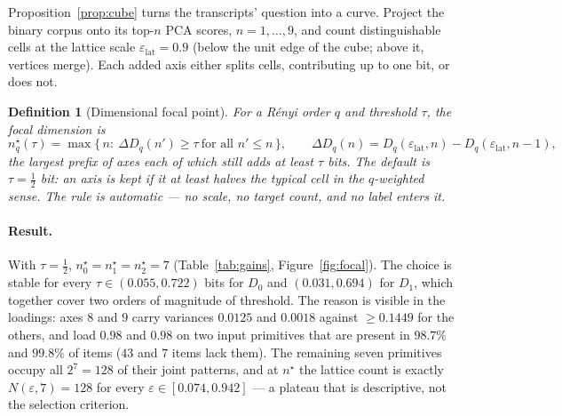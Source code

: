 \documentclass[11pt,a4paper]{article}
\theoremstyle{plain}
\newtheorem{definition}{Definition}
\theoremstyle{remark}
\begin{document}
Proposition~\ref{prop:cube} turns the transcripts' question into a curve. Project the binary corpus onto its top-$n$ PCA scores, $n=1,\dots,9$, and count distinguishable cells at the lattice scale $\varepsilon_{\mathrm{lat}}=0.9$ (below the unit edge of the cube; above it, vertices merge). Each added axis either splits cells, contributing up to one bit, or does not.

\begin{definition}[Dimensional focal point]
\label{def:focal}
For a Rényi order $q$ and threshold $\tau$, the focal dimension is
\begin{equation}
n^\star_q(\tau)=\max\{\,n:\ \Delta D_q(n')\ge\tau\ \text{for all } n'\le n\,\},\qquad \Delta D_q(n)=D_q(\varepsilon_{\mathrm{lat}},n)-D_q(\varepsilon_{\mathrm{lat}},n-1),\tag{2}
\end{equation}
the largest prefix of axes each of which still adds at least $\tau$ bits. The default is $\tau=\tfrac12$ bit: an axis is kept if it at least halves the typical cell in the $q$-weighted sense. The rule is automatic --- no scale, no target count, and no label enters it.
\end{definition}

\begin{table}[h]\centering\small
{}
\caption{Bits contributed by each PCA axis at lattice scale. The first seven axes each add at least $0.722$ bit; the eighth and ninth add $0.055$ and $0.022$. Under the margin-preserving curveball null the knee is also at seven, but the eighth axis adds $0.340$ bit.}
\label{tab:gains}
\end{table}

\paragraph{Result.} With $\tau=\tfrac12$, $n^\star_0=n^\star_1=n^\star_2=7$ (Table~\ref{tab:gains}, Figure~\ref{fig:focal}). The choice is stable for every $\tau\in(0.055,0.722)$ bits for $D_0$ and $(0.031,0.694)$ for $D_1$, which together cover two orders of magnitude of threshold. The reason is visible in the loadings: axes $8$ and $9$ carry variances $0.0125$ and $0.0018$ against $\ge0.1449$ for the others, and load $0.98$ and $0.98$ on two input primitives that are present in $98.7\%$ and $99.8\%$ of items ($43$ and $7$ items lack them). The remaining seven primitives occupy all $2^7=128$ of their joint patterns, and at $n^\star$ the lattice count is exactly $N(\varepsilon,7)=128$ for every $\varepsilon\in[0.074,0.942]$ --- a plateau that is descriptive, not the selection criterion.
\end{document}
